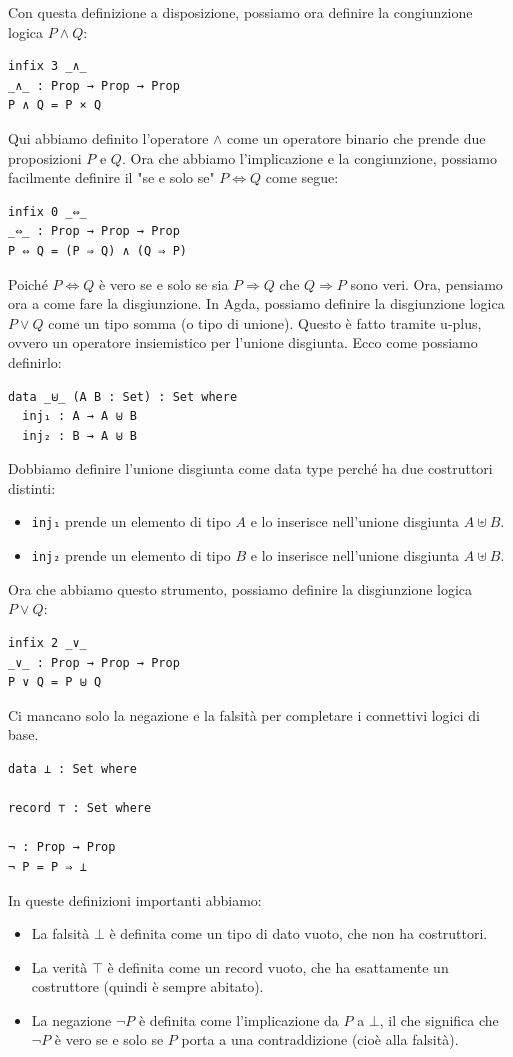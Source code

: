 \documentclass[a4paper]{article}
\theoremstyle{definition}
\theoremstyle{remark}
\begin{document}
Con questa definizione a disposizione, possiamo ora definire la congiunzione logica \( P ∧ Q \):
\begin{verbatim}
infix 3 _∧_
_∧_ : Prop → Prop → Prop
P ∧ Q = P × Q
\end{verbatim}
Qui abbiamo definito l'operatore \( ∧ \) come un operatore binario che prende due proposizioni \( P \) e \( Q \).
Ora che abbiamo l'implicazione e la congiunzione, possiamo facilmente definire il "se e solo se"
\( P ⇔ Q \) come segue:
\begin{verbatim}
infix 0 _⇔_
_⇔_ : Prop → Prop → Prop
P ⇔ Q = (P ⇒ Q) ∧ (Q ⇒ P)
\end{verbatim}
Poiché \( P ⇔ Q \) è vero se e solo se sia \( P ⇒ Q \) che \( Q ⇒ P \) sono veri.
Ora, pensiamo ora a come fare la disgiunzione.
In Agda, possiamo definire la disgiunzione logica \( P ∨ Q \) come un tipo somma (o tipo di unione).
Questo è fatto tramite u-plus, ovvero un operatore insiemistico per l'unione disgiunta. Ecco come possiamo definirlo:
\begin{verbatim}
data _⊎_ (A B : Set) : Set where
  inj₁ : A → A ⊎ B
  inj₂ : B → A ⊎ B
\end{verbatim}
Dobbiamo definire l'unione disgiunta come data type perché ha due costruttori distinti:
\begin{itemize}
  \item \texttt{inj₁} prende un elemento di tipo \( A \) e lo inserisce nell'unione disgiunta \( A ⊎ B \).
  \item \texttt{inj₂} prende un elemento di tipo \( B \) e lo inserisce nell'unione disgiunta \( A ⊎ B \).
\end{itemize}
Ora che abbiamo questo strumento, possiamo definire la disgiunzione logica \( P ∨ Q \):
\begin{verbatim}
infix 2 _∨_
_∨_ : Prop → Prop → Prop
P ∨ Q = P ⊎ Q
\end{verbatim}
Ci mancano solo la negazione e la falsità per completare i connettivi logici di base.
\begin{verbatim}
data ⊥ : Set where

record ⊤ : Set where

¬ : Prop → Prop
¬ P = P ⇒ ⊥
\end{verbatim}
In queste definizioni importanti abbiamo:
\begin{itemize}
  \item La falsità \( ⊥ \) è definita come un tipo di dato vuoto, che non ha costruttori.
  \item La verità \( ⊤ \) è definita come un record vuoto, che ha esattamente un costruttore (quindi è sempre abitato).
  \item La negazione \( \neg P \) è definita come l'implicazione da \( P \) a \( \bot \), il che significa che \( \neg P \) è vero se e solo se \( P \) porta a una contraddizione (cioè alla falsità).
\end{itemize}
\end{document}
